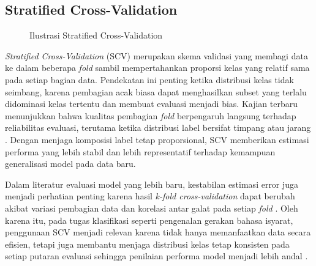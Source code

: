 \subsection{Stratified Cross-Validation} \label{II.SCV}
\noindent\begin{figure}[H]
	\centering
	
	\caption{Ilustrasi Stratified Cross-Validation}
	\label{fig:II.stratified_kfold}
\end{figure}
\textit{Stratified Cross-Validation} (SCV) merupakan skema validasi yang membagi data ke dalam beberapa \textit{fold} sambil mempertahankan proporsi kelas yang relatif sama pada setiap bagian data. Pendekatan ini penting ketika distribusi kelas tidak seimbang, karena pembagian acak biasa dapat menghasilkan subset yang terlalu didominasi kelas tertentu dan membuat evaluasi menjadi bias. Kajian terbaru menunjukkan bahwa kualitas pembagian \textit{fold} berpengaruh langsung terhadap reliabilitas evaluasi, terutama ketika distribusi label bersifat timpang atau jarang \cite{Tiittanen2022}. Dengan menjaga komposisi label tetap proporsional, SCV memberikan estimasi performa yang lebih stabil dan lebih representatif terhadap kemampuan generalisasi model pada data baru.

Dalam literatur evaluasi model yang lebih baru, kestabilan estimasi error juga menjadi perhatian penting karena hasil \textit{k-fold cross-validation} dapat berubah akibat variasi pembagian data dan korelasi antar galat pada setiap \textit{fold} \cite{Bates2021}. Oleh karena itu, pada tugas klasifikasi seperti pengenalan gerakan bahasa isyarat, penggunaan SCV menjadi relevan karena tidak hanya memanfaatkan data secara efisien, tetapi juga membantu menjaga distribusi kelas tetap konsisten pada setiap putaran evaluasi sehingga penilaian performa model menjadi lebih andal \cite{Tiittanen2022,Bates2021}.
